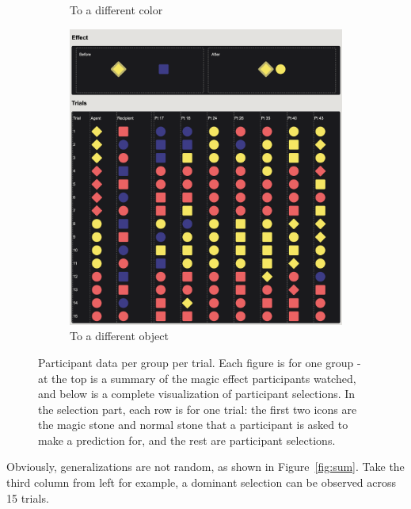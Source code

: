 \documentclass{article}
\begin{document}
\begin{figure}[h!]
\begin{subfigure}[t]{0.31\textwidth}
  	\caption{To a different color} \label{fig:raw_g4}
  \end{subfigure}
  \hfill
  \begin{subfigure}[t]{0.31\textwidth}
  	\centering
  	\includegraphics[width=\linewidth]{raw_g5} 
  	\caption{To a different object} \label{fig:raw_g5}
  \end{subfigure}
  \caption{Participant data per group per trial. Each figure is for one group - at the top is a summary of the magic effect participants watched, and below is a complete visualization of participant selections. In the selection part, each row is for one trial: the first two icons are the magic stone and normal stone that a participant is asked to make a prediction for, and the rest are participant selections.}
\end{figure}


\newpage
Obviously, generalizations are not random, as shown in Figure~\ref{fig:sum}. Take the third column from left for example, a dominant selection can be observed across 15 trials.
\end{document}
